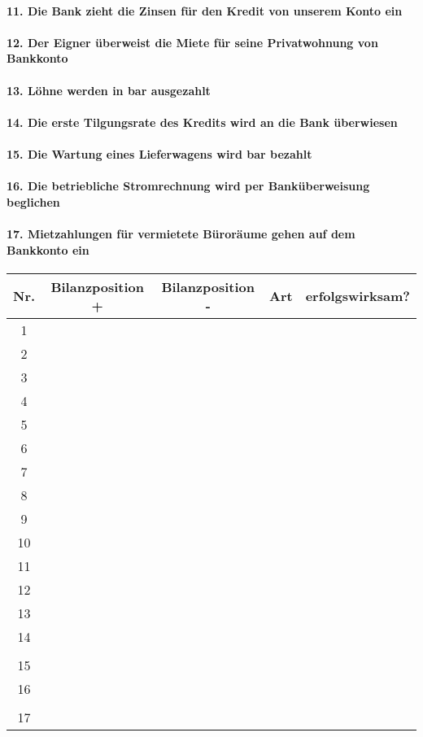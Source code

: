 \documentclass[paper=a4, fontsize=11pt]{scrartcl}
\numberwithin{equation}{section}
\numberwithin{figure}{section}
\numberwithin{table}{section}
\begin{document}
\paragraph{11. Die Bank zieht die Zinsen für den Kredit von unserem Konto ein}

\paragraph{12. Der Eigner überweist die Miete für seine Privatwohnung von Bankkonto}

\paragraph{13. Löhne werden in bar ausgezahlt}

\paragraph{14. Die erste Tilgungsrate des Kredits wird an die Bank überwiesen}

\paragraph{15. Die Wartung eines Lieferwagens wird bar bezahlt}

\paragraph{16. Die betriebliche Stromrechnung wird per Banküberweisung beglichen}

\paragraph{17. Mietzahlungen für vermietete Büroräume gehen auf dem Bankkonto ein}

\begin{tabular}{c|c|c|c|c}
Nr. & Bilanzposition + & Bilanzposition - & Art & erfolgswirksam? \\
\hline
1 & & & & \\
\hline
2 & & & & \\
\hline
3 & & & & \\
\hline
4 & & & & \\
\hline
5 & & & & \\
\hline
6 & & & & \\
\hline
7 & & & & \\
\hline
8 & & & & \\
\hline
9 & & & & \\
\hline
10  & & & & \\
\hline
11  & & & & \\
\hline
12 & & & & \\
\hline
13 & & & & \\
\hline
14 & & & & \\\\
\hline
15 & & & & \\
\hline
16 & & & & \\\\
\hline
17 & & & & \\
\hline
\end{tabular}
\end{document}
